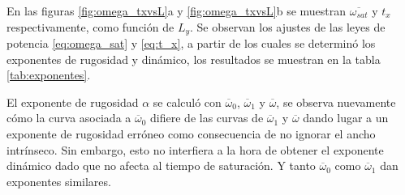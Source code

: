 En las figuras \ref{fig:omega_txvsL}a y \ref{fig:omega_txvsL}b se muestran $\overline{\omega_{sat}}$ y $t_x$ respectivamente, como función de $L_y$. Se observan los ajustes de las leyes de potencia \ref{eq:omega_sat} y \ref{eq:t_x}, a partir de los cuales se determinó los exponentes de rugosidad y dinámico, los resultados se muestran en la tabla \ref{tab:exponentes}. 

El exponente de rugosidad $\alpha$ se calculó con $\overline{\omega}_0$, $\overline{\omega}_1$ y $\overline{\omega}$, se observa nuevamente cómo la curva asociada a $\overline{\omega}_0$ difiere de las curvas de $\overline{\omega}_1$ y $\overline{\omega}$ dando lugar a un exponente de rugosidad erróneo como consecuencia de no ignorar el ancho intrínseco. Sin embargo, esto no interfiera a la hora de obtener el exponente dinámico dado que no afecta al tiempo de saturación. Y tanto $\overline{\omega}_0$ como $\overline{\omega}_1$ dan exponentes similares.

